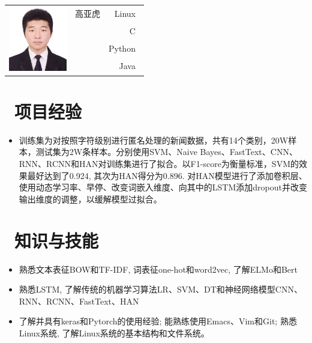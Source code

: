 \documentclass[10pt]{resume}
\begin{document}

\Large{
  \begin{tabu}{ c l r }
     & \scshape{高亚虎} & {Linux~} \\
    &  & {C~} \\
    &  & {Python~} \\
    &  & {Java~}
  \end{tabu}
}

\section{\faCogs\ 项目经验}
\begin{itemize}\normalsize
  \item{训练集为对按照字符级别进行匿名处理的新闻数据，共有14个类别，20W样本，测试集为2W条样本。分别使用SVM、Naive Bayes、FastText、CNN、RNN、RCNN和HAN对训练集进行了拟合。以F1-score为衡量标准，SVM的效果最好达到了0.924, 其次为HAN得分为0.896. 对HAN模型进行了添加卷积层、使用动态学习率、早停、改变词嵌入维度、向其中的LSTM添加dropout并改变输出维度的调整，以缓解模型过拟合。}
  \end{itemize}

\section{\faCogs\ 知识与技能}
\begin{itemize}[parsep=0.5ex]\normalsize
  \item {熟悉文本表征BOW和TF-IDF, 词表征one-hot和word2vec, 了解ELMo和Bert}
  \item {熟悉LSTM, 了解传统的机器学习算法LR、SVM、DT和神经网络模型CNN、RNN、RCNN、FastText、HAN}
  \item {了解并具有keras和Pytorch的使用经验; 能熟练使用Emacs、Vim和Git; 熟悉Linux系统, 了解Linux系统的基本结构和文件系统。}
  \end{itemize}
  
\end{document}
